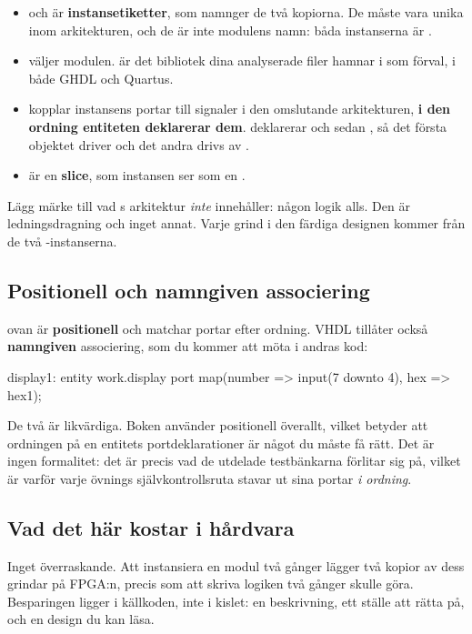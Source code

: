 \begin{itemize}
  \item {} och  är \textbf{instansetiketter}, som namnger de två
    kopiorna. De måste vara unika inom arkitekturen, och de är inte modulens namn: båda
    instanserna är .
  \item {} väljer modulen.  är det bibliotek dina analyserade
    filer hamnar i som förval, i både GHDL och Quartus.
  \item {} kopplar instansens portar till signaler i den omslutande
    arkitekturen, \textbf{i den ordning entiteten deklarerar dem}.  deklarerar
     och sedan , så det första objektet driver  och det andra
    drivs av .
  \item {} är en \textbf{slice}, som instansen ser som en
    .
\end{itemize}

Lägg märke till vad s arkitektur \emph{inte} innehåller: någon logik alls. Den
är ledningsdragning och inget annat. Varje grind i den färdiga designen kommer från de två
-instanserna.

\subsection*{Positionell och namngiven associering}
 ovan är \textbf{positionell} och matchar portar efter ordning. VHDL tillåter också
\textbf{namngiven} associering, som du kommer att möta i andras kod:

\begin{vhdlcode}
display1: entity work.display
    port map(number => input(7 downto 4), hex => hex1);
\end{vhdlcode}

De två är likvärdiga. Boken använder positionell överallt, vilket betyder att ordningen på en
entitets portdeklarationer är något du måste få rätt. Det är ingen formalitet: det är precis vad
de utdelade testbänkarna förlitar sig på, vilket är varför varje övnings självkontrollsruta
stavar ut sina portar \emph{i ordning}.

\subsection*{Vad det här kostar i hårdvara}
Inget överraskande. Att instansiera en modul två gånger lägger två kopior av dess grindar på
FPGA:n, precis som att skriva logiken två gånger skulle göra. Besparingen ligger i källkoden, inte
i kislet: en beskrivning, ett ställe att rätta på, och en design du kan läsa.

